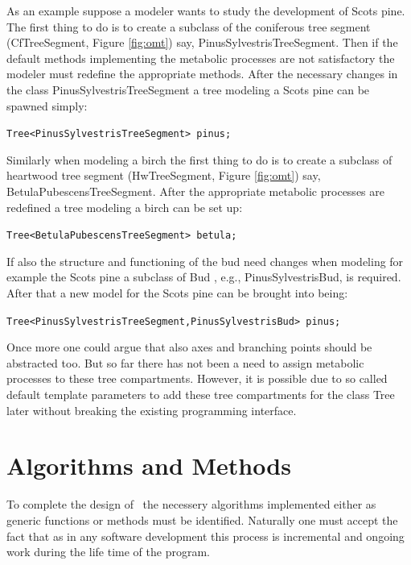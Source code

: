 As  an  example suppose a  modeler wants  to  study the development of
Scots  pine.  The first  thing to  do is to   create a subclass of the
coniferous   tree segment  (CfTreeSegment, Figure  \ref{fig:omt}) say, 
PinusSylvestrisTreeSegment.  Then if  the default methods implementing
the metabolic processes are not satisfactory the modeler must redefine
the appropriate  methods.  After the  necessary  changes in the  class
PinusSylvestrisTreeSegment a tree modeling a Scots pine can be spawned
simply:

\begin{center}
\tt Tree<PinusSylvestrisTreeSegment> pinus;\rm
\end{center}

Similarly when modeling a birch the  first thing to do  is to create a
subclass    of  heartwood    tree  segment    (HwTreeSegment,   Figure
\ref{fig:omt}) say,  BetulaPubescensTreeSegment.      After   the
appropriate metabolic processes are  redefined a tree modeling a birch
can be set up:

\begin{center}
\tt Tree<BetulaPubescensTreeSegment> betula;\rm
\end{center}


If  also the structure and  functioning of the  bud  need changes when
modeling  for  example  the Scots pine  a   subclass of   Bud  , e.g.,
PinusSylvestrisBud, is required.  After that a new model for the Scots
pine can be brought into being:

\begin{center}
\tt Tree<PinusSylvestrisTreeSegment,PinusSylvestrisBud> pinus;\rm
\end{center}

Once more one could argue  that also axes  and branching points should
be abstracted too.  But  so far there  has not been  a need  to assign
metabolic  processes  to these   tree   compartments.  However, it  is
possible   due to so called  default  template parameters to add these
tree  compartments for the    class Tree later  without   breaking the
existing programming interface.

\section{Algorithms and Methods}

To  complete the   design  of    \lignum\ the necessery     algorithms
implemented  either   as generic   functions     or methods must    be
identified. Naturally one must accept the fact that as in any software
development this  process is incremental and   ongoing work during the
life time of the program.

